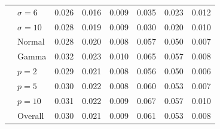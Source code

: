 \begin{tabular}{llrrrrrr}
 & $\sigma=6$ & 0.026 & 0.016 & 0.009 & 0.035 & 0.023 & 0.012 \\
 & $\sigma=10$ & 0.028 & 0.019 & 0.009 & 0.030 & 0.020 & 0.010 \\
 & Normal & 0.028 & 0.020 & 0.008 & 0.057 & 0.050 & 0.007 \\
 & Gamma & 0.032 & 0.023 & 0.010 & 0.065 & 0.057 & 0.008 \\
 & $p=2$ & 0.029 & 0.021 & 0.008 & 0.056 & 0.050 & 0.006 \\
 & $p=5$ & 0.030 & 0.022 & 0.008 & 0.060 & 0.053 & 0.007 \\
 & $p=10$ & 0.031 & 0.022 & 0.009 & 0.067 & 0.057 & 0.010 \\
 & Overall & 0.030 & 0.021 & 0.009 & 0.061 & 0.053 & 0.008 \\
\bottomrule
\end{tabular}
